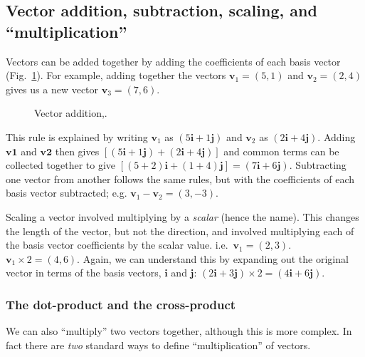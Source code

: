 \documentclass[a4paper]{article}
\renewcommand{\vec}[1]{\mathbf{#1}}
\begin{document}
\subsection{Vector addition, subtraction, scaling, and ``multiplication''}
Vectors can be added together by adding the coefficients of each basis vector (Fig.~\ref{fig:vector_addition}). For example, adding together the vectors $\vec{v}_1=(5,1)$ and $\vec{v}_2=(2,4)$ gives us a new vector $\vec{v}_3=(7,6)$. \begin{figure}[htb]
  \centering
    \caption{\label{fig:vector_addition}Vector addition,.}
\end{figure}
This rule is explained by writing $\vec{v}_1$ as $(5\vec{i}+1\vec{j})$ and $\vec{v}_2$ as $(2\vec{i}+4\vec{j})$. Adding $\vec{v1}$ and $\vec{v2}$ then gives $\left[(5\vec{i}+1\vec{j})+(2\vec{i}+4\vec{j})\right]$ and common terms can be collected together to give $\left[(5+2)\vec{i}+(1+4)\vec{j}\right]=(7\vec{i}+6\vec{j})$. Subtracting one vector from another follows the same rules, but with the coefficients of each basis vector subtracted; e.g. $\vec{v}_1-\vec{v}_2=(3,-3)$. 

Scaling a vector involved multiplying by a \emph{scalar} (hence the name). This changes the length of the vector, but not the direction, and involved multiplying each of the basis vector coefficients by the scalar value. i.e.~$\vec{v}_\mathrm{1}=(2,3)$. $\vec{v}_1\times2=(4,6)$. Again, we can understand this by expanding out the original vector in terms of the basis vectors, $\vec{i}$ and $\vec{j}$: $(2\vec{i}+3\vec{j})\times2=(4\vec{i}+6\vec{j})$.

\subsubsection{The dot-product and the cross-product}
We can also ``multiply'' two vectors together, although this is more complex. In fact there are \emph{two} standard ways to define ``multiplication'' of vectors.
\end{document}
